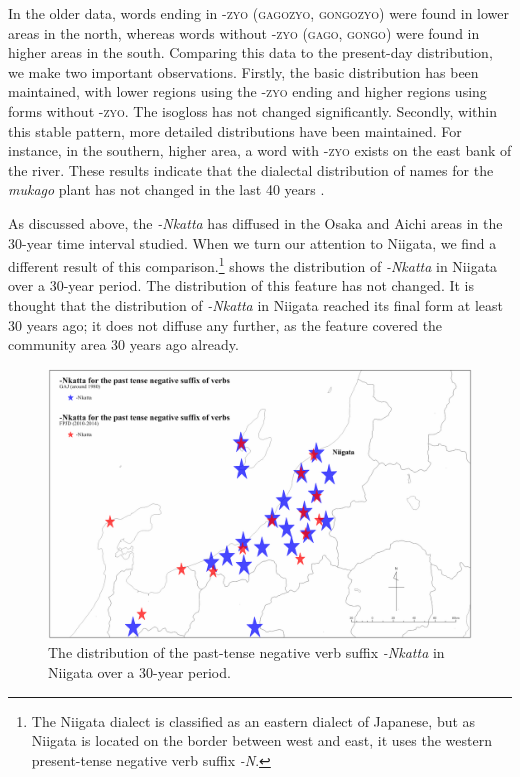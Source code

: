 \documentclass[output=paper]{LSP/langsci}
\begin{document}
In the older data, words ending in \textsc{-zyo} (\textsc{gagozyo}, \textsc{gongozyo}) were found in lower areas in the north, whereas words without \textsc{-zyo} (\textsc{gago}, \textsc{gongo}) were found in higher areas in the south. Comparing this data to the present-day distribution, we make two important observations. Firstly, the basic distribution has been maintained, with lower regions using the \textsc{-zyo} ending and higher regions using forms without \textsc{-zyo}. The isogloss has not changed significantly. Secondly, within this stable pattern, more detailed distributions have been maintained. For instance, in the southern, higher area, a word with \textsc{-zyo} exists on the east bank of the river. These results indicate that the dialectal distribution of names for the \textit{mukago} plant has not changed in the last 40 years \citep{onishi_relationship_inprint}.

As discussed above, the  \textit{-Nkatta} has diffused in the Osaka and Aichi areas in the 30-year time interval studied. When we turn our attention to Niigata, we find a different result of this  comparison.\footnote{ The Niigata dialect is classified as an eastern dialect of Japanese, but as Niigata is located on the border between west and east, it uses the western present-tense negative verb suffix \textit{-N}.}  shows the distribution of \textit{-Nkatta} in Niigata over a 30-year period. The distribution of this feature has not changed. It is thought that the distribution of \textit{-Nkatta} in Niigata reached its final form at least 30 years ago; it does not diffuse any further, as the feature covered the community area 30 years ago already.



\begin{figure}[t]
\includegraphics[width=\textwidth]{illustrations/onishi_fig8}
\caption{The distribution of the past-tense negative verb suffix \textit{-Nkatta} in Niigata over a 30-year period.}
\label{fig:onishi:8}
\end{figure}
\end{document}
